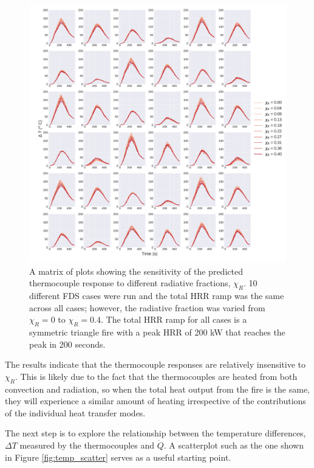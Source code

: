 \documentclass{article}
\begin{document}
\begin{figure}[htb] \centering
\includegraphics[width=.9\textwidth]{./figures/constant_Qtot_assumption.pdf}
\caption{A matrix of plots showing the sensitivity of the predicted thermocouple response to different radiative fractions, $\chi_R$. 10 different FDS cases were run and the total HRR ramp was the same across all cases; however, the radiative fraction was varied from $\chi_R = 0$ to $\chi_R=0.4$. The total HRR ramp for all cases is a symmetric triangle fire with a peak HRR of 200 kW that reaches the peak in 200 seconds.}
\label{fig:constant_Qtot_assumption}
\end{figure}

The results indicate that the thermocouple responses are relatively insensitive to $\chi_R$. This is likely due to the fact that the thermocouples are heated from both convection and radiation, so when the total heat output from the fire is the same, they will experience a similar amount of heating irrespective of the contributions of the individual heat transfer modes. 

The next step is to explore the relationship between the temperature differences, $\Delta T$ measured by the thermocouples and $\dot{Q}$. A scatterplot such as the one shown in Figure \ref{fig:temp_scatter} serves as a useful starting point.  
\end{document}
